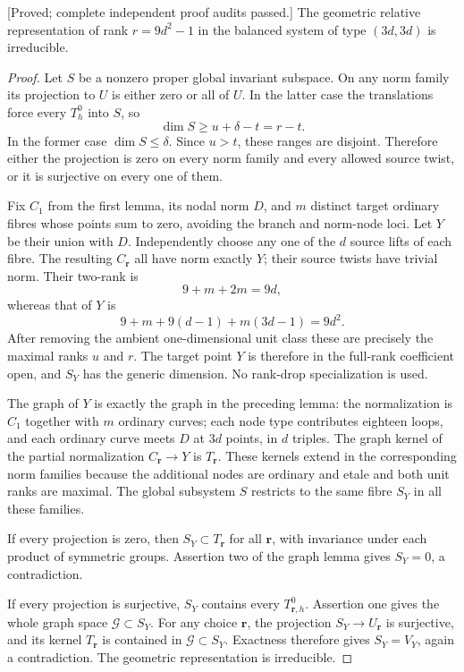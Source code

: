 \begin{proposition}
\label{prop:mixed-odd-balanced-irreducibility-candidate}
\textup{[Proved; complete independent proof audits passed.]}
The geometric relative representation of rank $r=9d^2-1$
in the balanced system of type $(3d,3d)$ is irreducible.
\end{proposition}
\begin{proof}
Let $S$ be a nonzero proper global invariant subspace. On any
norm family its projection to $U$ is either zero or all of $U$.
In the latter case the translations force every $T_h^0$ into
$S$, so
\[
                         \dim S\geq u+\delta-t=r-t.
\]
In the former case $\dim S\leq\delta$. Since $u>t$, these
ranges are disjoint. Therefore either the projection is zero
on every norm family and every allowed source twist, or it
is surjective on every one of them.

Fix $C_1$ from the first lemma, its nodal norm $D$, and $m$
distinct target ordinary fibres whose points sum to zero,
avoiding the branch and norm-node loci. Let $Y$ be their union
with $D$. Independently choose any one of the $d$ source lifts
of each fibre. The resulting $C_{\mathbf r}$ all have norm
exactly $Y$; their source twists have trivial norm. Their
two-rank is
\[
                 9+m+2m=9d,
\]
whereas that of $Y$ is
\[
       9+m+9(d-1)+m(3d-1)=9d^2.
\]
After removing the ambient one-dimensional unit class these
are precisely the maximal ranks $u$ and $r$. The target point
$Y$ is therefore in the full-rank coefficient open, and $S_Y$
has the generic dimension. No rank-drop specialization is used.

The graph of $Y$ is exactly the graph in the preceding lemma:
the normalization is $C_1$ together with $m$ ordinary curves;
each node type contributes eighteen loops, and each ordinary
curve meets $D$ at $3d$ points, in $d$ triples. The graph kernel
of the partial normalization $C_{\mathbf r}\to Y$ is
$T_{\mathbf r}$. These kernels extend in the corresponding
norm families because the additional nodes are ordinary and
etale and both unit ranks are maximal. The global subsystem
$S$ restricts to the same fibre $S_Y$ in all these families.

If every projection is zero, then $S_Y\subset T_{\mathbf r}$
for all $\mathbf r$, with invariance under each product of
symmetric groups. Assertion two of the graph lemma gives
$S_Y=0$, a contradiction.

If every projection is surjective, $S_Y$ contains every
$T_{\mathbf r,h}^0$. Assertion one gives the whole graph
space $\mathcal G\subset S_Y$. For any choice $\mathbf r$,
the projection $S_Y\to U_{\mathbf r}$ is surjective, and its
kernel $T_{\mathbf r}$ is contained in $\mathcal G\subset S_Y$.
Exactness therefore gives $S_Y=V_Y$, again a contradiction. The geometric
representation is irreducible.
\end{proof}

